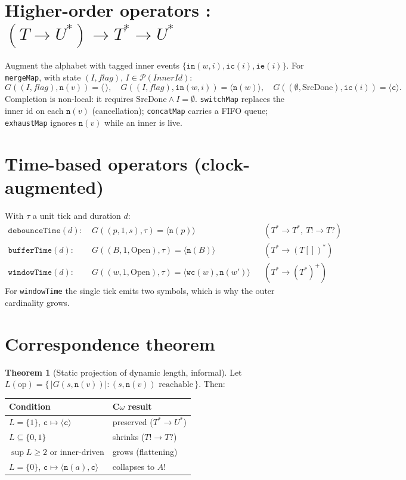\documentclass[11pt]{article}
\newcommand{\nx}[1]{\mathtt{n}(#1)}      %
\newcommand{\cmpl}{\mathtt{c}}           %
\newcommand{\tick}{\tau}                 %
\newcommand{\emptyout}{\langle\,\rangle} %
\newcommand{\outseq}[1]{\langle #1 \rangle}
\newcommand{\outfun}{G}
\theoremstyle{definition}
\newtheorem{theorem}{Theorem}
\begin{document}
\section{Higher-order operators : $(T\to U^{*})\to T^{*}\to U^{*}$}
Augment the alphabet with tagged inner events
$\{\mathtt{in}(w,i),\mathtt{ic}(i),\mathtt{ie}(i)\}$. For \texttt{mergeMap}, with state
$(I,\mathit{flag})$, $I\in\mathcal{P}(\mathit{InnerId})$:
\[
\outfun((I,\mathit{flag}),\nx{v})=\emptyout,\quad
\outfun((I,\mathit{flag}),\mathtt{in}(w,i))=\outseq{\nx{w}},\quad
\outfun((\emptyset,\mathrm{SrcDone}),\mathtt{ic}(i))=\outseq{\cmpl}.
\]
Completion is non-local: it requires $\mathrm{SrcDone}\wedge I=\emptyset$. \texttt{switchMap}
replaces the inner id on each $\nx{v}$ (cancellation); \texttt{concatMap} carries a FIFO queue;
\texttt{exhaustMap} ignores $\nx{v}$ while an inner is live.

\section{Time-based operators (clock-augmented)}
With $\tick$ a unit tick and duration $d$:
\[
\begin{aligned}
\texttt{debounceTime}(d):\ &
\outfun((p,1,s),\tick)=\outseq{\nx{p}} &&(T^{*}\to T^{*},\ T!\to T?)\\
\texttt{bufferTime}(d):\ &
\outfun((B,1,\mathrm{Open}),\tick)=\outseq{\nx{B}} &&(T^{*}\to (T[])^{*})\\
\texttt{windowTime}(d):\ &
\outfun((w,1,\mathrm{Open}),\tick)=\outseq{\mathtt{wc}(w),\nx{w'}} &&(T^{*}\to (T^{*})^{+})
\end{aligned}
\]
For \texttt{windowTime} the single tick emits two symbols, which is why the outer cardinality
grows.

\section{Correspondence theorem}
\begin{theorem}[Static projection of dynamic length, informal]
Let $L(\mathrm{op})=\{\,|\outfun(s,\nx{v})| : (s,\nx{v})\text{ reachable}\,\}$. Then:
\begin{center}
\begin{tabular}{ll}
\toprule
Condition & C$\omega$ result \\
\midrule
$L=\{1\}$, $\cmpl\mapsto\outseq{\cmpl}$ & preserved ($T^{*}\to U^{*}$) \\
$L\subseteq\{0,1\}$                     & shrinks ($T!\to T?$) \\
$\sup L\ge 2$ or inner-driven           & grows (flattening) \\
$L=\{0\}$, $\cmpl\mapsto\outseq{\nx{a},\cmpl}$ & collapses to $A!$ \\
\bottomrule
\end{tabular}
\end{center}
\end{theorem}
\end{document}
